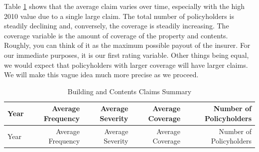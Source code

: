 \documentclass[]{book}
\begin{document}
Table \ref{tab:CoverageBCIM} shows that the average claim varies over
time, especially with the high 2010 value due to a single large claim.
The total number of policyholders is steadily declining and, conversely,
the coverage is steadily increasing. The coverage variable is the amount
of coverage of the property and contents. Roughly, you can think of it
as the maximum possible payout of the insurer. For our immediate
purposes, it is our first rating variable. Other things being equal, we
would expect that policyholders with larger coverage will have larger
claims. We will make this vague idea much more precise as we proceed.

\begin{longtable}[]{@{}lrrrr@{}}
\caption{\label{tab:CoverageBCIM} Building and Contents Claims
Summary}\tabularnewline
\toprule
\begin{minipage}[b]{0.25\columnwidth}\raggedright\strut
Year\strut
\end{minipage} & \begin{minipage}[b]{0.14\columnwidth}\raggedleft\strut
Average Frequency\strut
\end{minipage} & \begin{minipage}[b]{0.13\columnwidth}\raggedleft\strut
Average Severity\strut
\end{minipage} & \begin{minipage}[b]{0.15\columnwidth}\raggedleft\strut
Average Coverage\strut
\end{minipage} & \begin{minipage}[b]{0.17\columnwidth}\raggedleft\strut
Number of Policyholders\strut
\end{minipage}\tabularnewline
\midrule
\endfirsthead
\toprule
\begin{minipage}[b]{0.25\columnwidth}\raggedright\strut
Year\strut
\end{minipage} & \begin{minipage}[b]{0.14\columnwidth}\raggedleft\strut
Average Frequency\strut
\end{minipage} & \begin{minipage}[b]{0.13\columnwidth}\raggedleft\strut
Average Severity\strut
\end{minipage} & \begin{minipage}[b]{0.15\columnwidth}\raggedleft\strut
Average Coverage\strut
\end{minipage} & \begin{minipage}[b]{0.17\columnwidth}\raggedleft\strut
Number of Policyholders\strut
\end{minipage}\tabularnewline

\end{longtable}
\end{document}
